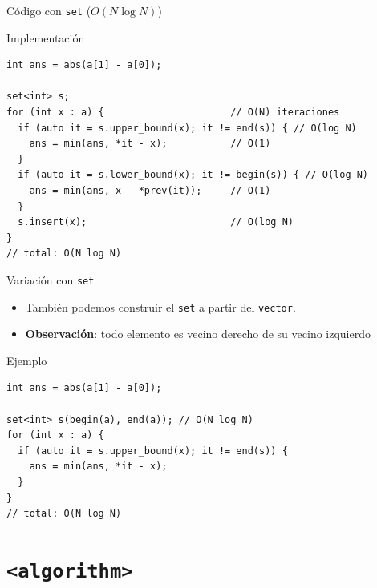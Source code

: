 \documentclass[aspectratio=169]{beamer}
\begin{document}
\begin{frame}[fragile]{Código con \texttt{set} (\(O(N \log N)\))}
  \begin{block}{Implementación}
  \begin{lstlisting}[style=customc]
int ans = abs(a[1] - a[0]);

set<int> s;
for (int x : a) {                      // O(N) iteraciones
  if (auto it = s.upper_bound(x); it != end(s)) { // O(log N)
    ans = min(ans, *it - x);           // O(1)
  }
  if (auto it = s.lower_bound(x); it != begin(s)) { // O(log N)
    ans = min(ans, x - *prev(it));     // O(1)
  }
  s.insert(x);                         // O(log N)
}
// total: O(N log N)
  \end{lstlisting}
  \end{block}
\end{frame}

\begin{frame}[fragile]{Variación con \texttt{set}}
  \begin{itemize}
    \item También podemos construir el \texttt{set} a partir del \texttt{vector}.
    \item \textbf{Observación}: todo elemento es vecino derecho de su vecino izquierdo
  \end{itemize}
  \begin{block}{Ejemplo}
  \begin{lstlisting}[style=customc]
int ans = abs(a[1] - a[0]);

set<int> s(begin(a), end(a)); // O(N log N)
for (int x : a) {
  if (auto it = s.upper_bound(x); it != end(s)) {
    ans = min(ans, *it - x);
  }
}
// total: O(N log N)
  \end{lstlisting}
  \end{block}
\end{frame}

\section{\texttt{<algorithm>}}
\end{document}
